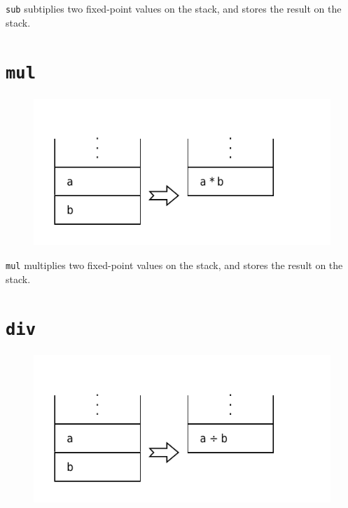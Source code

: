		\texttt{sub} subtiplies two fixed-point values on the stack, and stores
		the result on the stack.

\section*{\texttt{mul}}

	\begin{figure}
		\begin{flushright}
			\includegraphics[width=0.9\linewidth]{figure/pdf/i_mul} 
		\end{flushright}
	\end{figure}

		\texttt{mul} multiplies two fixed-point values on the stack, and stores
		the result on the stack.

\section*{\texttt{div}}

	\begin{figure}
		\begin{flushright}
			\includegraphics[width=0.9\linewidth]{figure/pdf/i_div} 
		\end{flushright}
	\end{figure}

